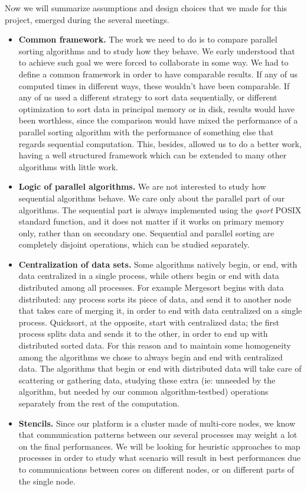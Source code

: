 Now we will summarize assumptions and design choices that we made for this project, emerged during the several meetings. 
\begin{itemize}
	\item{\textbf{Common framework.} The work we need to do is to compare parallel sorting algorithms and to study how they behave. We early understood that to achieve such goal we were forced to collaborate in some way. We had to define a common framework in order to have comparable results. If any of us computed times in different ways, these wouldn't have been comparable. If any of us used a different strategy to sort data sequentially, or different optimization to sort data in principal memory or in disk, results would have been worthless, since the comparison would have mixed the performance of a parallel sorting algorithm with the performance of something else that regards sequential computation. This, besides, allowed us to do a better work, having a well structured framework which can be extended to many other algorithms with little work.}
	\item{\textbf{Logic of parallel algorithms.} We are not interested to study how sequential algorithms behave. We care only about the parallel part of our algorithms. The sequential part is always implemented using the \textit{qsort} POSIX standard function, and it does not matter if it works on primary memory only, rather than on secondary one. Sequential and parallel sorting are completely disjoint operations, which can be studied separately.}
	\item{\textbf{Centralization of data sets.} Some algorithms natively begin, or end, with data centralized in a single process, while others begin or end with data distributed among all processes. For example Mergesort begins with data distributed: any process sorts its piece of data, and send it to another node that takes care of merging it, in order to end with data centralized on a single process. Quicksort, at the opposite, start with centralized data; the first process splits data and sends it to the other, in order to end up with distributed sorted data. For this reason and to maintain some homogeneity among the algorithms we chose to always begin and end with centralized data. The algorithms that begin or end with distributed data will take care of scattering or gathering data, studying these extra (ie: unneeded by the algorithm, but needed by our common algorithm-testbed) operations separately from the rest of the computation.}
	\item{\textbf{Stencils.} Since our platform is a cluster made of multi-core nodes, we know that communication patterns between our several processes may weight a lot on the final performances. We will be looking for heuristic approaches to map processes in order to study what scenario will result in best performances due to communications between cores on different nodes, or on different parts of the single node.}
\end{itemize}
